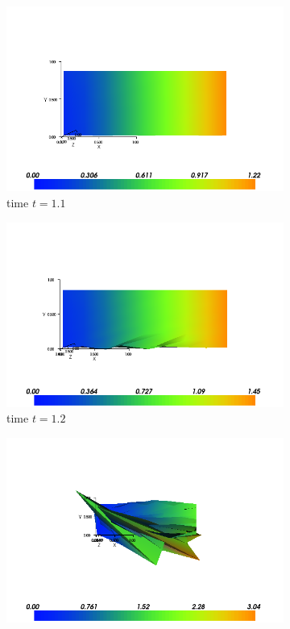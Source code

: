\documentclass[twoside]{article}
\begin{document}
\begin{figure}
        \begin{subfigure}[h]{0.31\textwidth}
                \centering
                \includegraphics[width=\textwidth]{test_t=11}
                \caption{time \( t = 1.1\)}
                \label{fig:test_t=1.1}
        \end{subfigure}
        \begin{subfigure}[h]{0.31\textwidth}
                \centering
                \includegraphics[width=\textwidth]{test_t=12}
                \caption{time \( t = 1.2\)}
                \label{fig:test_t=1.2}
        \end{subfigure}
        \begin{subfigure}[h]{0.31\textwidth}
                \centering
                \includegraphics[width=\textwidth]{test_t=13}

\end{subfigure}
\end{figure}
\end{document}

